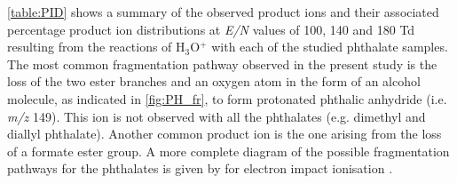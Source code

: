  \autoref{table:PID} shows a summary of the observed product ions and their associated percentage product ion distributions at \textit{E/N} values of 100, 140 and 180 Td resulting from the reactions of H$_3$O$^+$ with each of the studied phthalate samples. 
%
The most common fragmentation pathway observed in the present study is the loss of the two %
ester branches and an oxygen atom in the form of an alcohol molecule, as indicated in \autoref{fig:PH_fr}, to form protonated phthalic anhydride (i.e. \textit{m/z} 149).
%
This ion is not observed with all the phthalates (e.g. dimethyl and diallyl phthalate).%
%
Another common product ion is the one arising from the loss of a formate ester group.
%
A more complete diagram of the possible fragmentation pathways for the phthalates is  given by \citeauthor{yin2014mass} for electron impact ionisation \cite{yin2014mass}.


